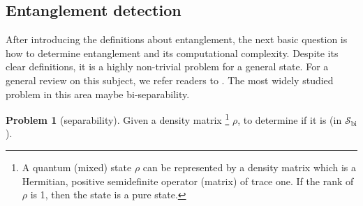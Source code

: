 \documentclass[
aps,
pra,
twocolumn,
floatfix,
]{revtex4-2}
\theoremstyle{plain}
\theoremstyle{definition}
\newtheorem{problem}{Problem}
\newtheorem{remark}{Remark}
\newcommand{\dm}{\rho}
\newcommand{\bi}{\text{bi}}
\newcommand{\separable}{\mathcal{S}}
\begin{document}





\subsection{Entanglement detection}
After introducing the definitions about entanglement, 
the next basic question is how to determine entanglement and its computational complexity.
Despite its clear definitions, it is a highly non-trivial problem for a general state.
For a general review on this subject, we refer readers to \cite{guhneEntanglementDetection2009}.
The most widely studied problem in this area maybe bi-separability.
\begin{problem}[separability]\label{prm:separability}
	Given a density matrix 
	\footnote{
		A quantum (mixed) state $\dm$ can be represented by a density matrix which is a Hermitian, positive semidefinite operator (matrix) of trace one. If the rank of $\dm$ is 1, then the state is a pure state.
	}
	$\dm$, to determine if it is  (in $\separable_{\bi}$).
\end{problem}
\end{document}

